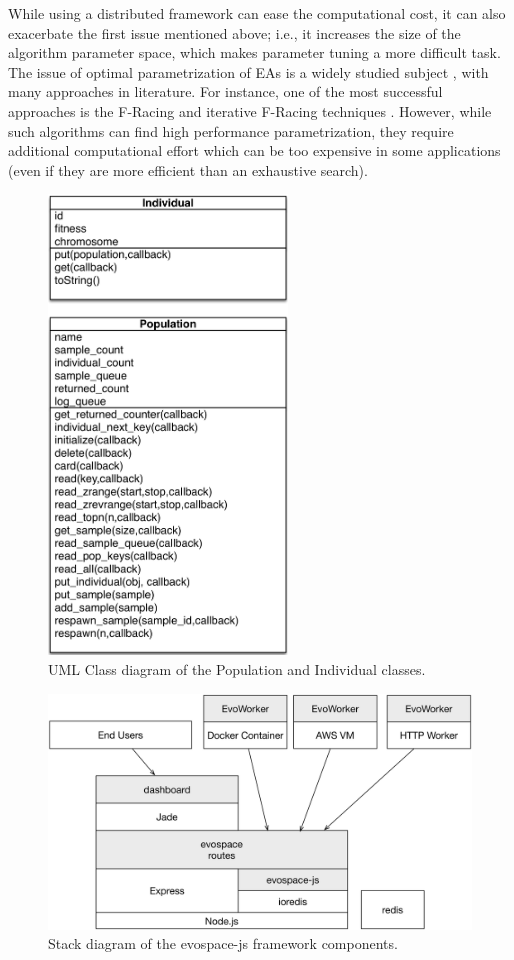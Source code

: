 While using a distributed framework can ease the computational cost, it can also exacerbate the first issue mentioned above;
i.e., it increases the size of the algorithm parameter space, which makes parameter tuning a more difficult task.
The issue of optimal parametrization of EAs is a widely studied subject \cite{de2007parameter}, 
with many approaches in literature. For instance, one of the most successful approaches 
is the F-Racing and iterative F-Racing techniques \cite{lopez2011irace}. 
However, while such algorithms can find high performance parametrization, 
they require additional computational effort which can be too expensive in some applications
(even if they are more efficient than an exhaustive search).

\begin{figure}[!t]
    \centering
        \includegraphics[width=2.5in]{img/classes.png}
    \caption{ UML Class diagram of the Population and Individual classes.}
    \label{fig:classes}
\end{figure}
%
\begin{figure}[!t]
    \centering
        \includegraphics[width=5.4in]{img/evospace-js.png}
    \caption{ Stack diagram of the {\sf evospace-js} framework components.}
    \label{fig:stack}
\end{figure}

